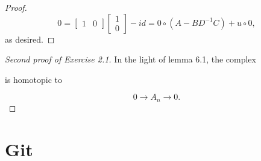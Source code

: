 \documentclass[psamsfonts,a4paper]{amsart}
\theoremstyle{plain}
\numberwithin{equation}{section}
\numberwithin{figure}{section}
\renewcommand{\b}{\beta}
\newcommand{\ra}{\rightarrow}
\newcommand{\tb}{\textbf}
\newcommand{\ot}{\otimes}
\newcommand{\op}{\oplus}
\newcommand{\<}{\langle}
\renewcommand{\>}{\rangle}
\theoremstyle{named}
\theoremstyle{name}
\begin{document}
\begin{proof}
$$ 0 = \begin{bmatrix}
1 & 0 \end{bmatrix}  \begin{bmatrix}
1 \\ 0 \end{bmatrix} 
 - id = 0 \circ (A-BD^{-1}C) + u \circ 0,  $$
as desired. 

\end{proof}

\vspace{10mm}

\begin{proof}[Second proof of Exercise 2.1]
In the light of lemma 6.1, the complex\\

\begin{center}
\end{center}
is homotopic to 

$$ 0 \ra A_n \ra 0.$$

\end{proof}

\section{Git}
\end{document}
